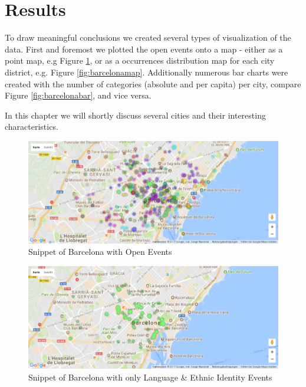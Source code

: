 \section{Results}\label{sec:results}

To draw meaningful conclusions we created several types of visualization of the data. First and foremost we plotted the open events onto a map - either as a point map, e.g Figure \ref{fig:barcelonapoints}, or as a occurrences distribution map for each city district, e.g. Figure \ref{fig:barcelonamap}. Additionally numerous bar charts were created with the number of categories (absolute and per capita) per city, compare Figure \ref{fig:barcelonabar}, and vice versa. 

In this chapter we will shortly discuss several cities and their interesting characteristics. 

\begin{figure}[!htp]
	\includegraphics[width=1\linewidth]{images/Barcelona_points.png}
	\caption{Snippet of Barcelona with Open Events}\label{fig:barcelonapoints}	
\end{figure}

\begin{figure}[!htp]
	\includegraphics[width=1\linewidth]{images/Barcelona_points_Language.png}
	\caption{Snippet of Barcelona with only Language \& Ethnic Identity Events}\label{fig:barcelonapointslanguage}	
\end{figure}

